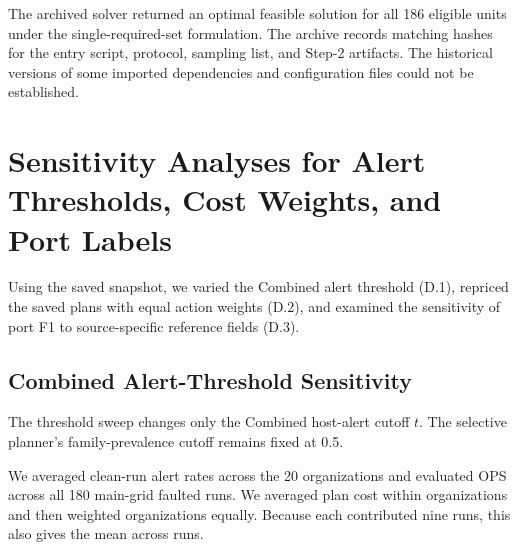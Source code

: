 \documentclass[sn-basic]{sn-jnl}%
\theoremstyle{thmstyleone}%
\theoremstyle{thmstyletwo}%
\theoremstyle{thmstylethree}%
\begin{document}
\begin{appendices}
The archived solver returned an optimal feasible solution for all 186 eligible units under the single-required-set formulation. The archive records matching hashes for the entry script, protocol, sampling list, and Step-2 artifacts. The historical versions of some imported dependencies and configuration files could not be established.

\section{Sensitivity Analyses for Alert Thresholds, Cost Weights, and Port Labels}\label{app:d}

\setcounter{table}{0}

Using the saved snapshot, we varied the Combined alert threshold (D.1), repriced the saved plans with equal action weights (D.2), and examined the sensitivity of port F1 to source-specific reference fields (D.3).

\subsection{Combined Alert-Threshold Sensitivity}\label{app:d-1}

The threshold sweep changes only the Combined host-alert cutoff \(t\). The selective planner's family-prevalence cutoff remains fixed at 0.5.

We averaged clean-run alert rates across the 20 organizations and evaluated OPS across all 180 main-grid faulted runs. We averaged plan cost within organizations and then weighted organizations equally. Because each contributed nine runs, this also gives the mean across runs.


\end{appendices}
\end{document}
